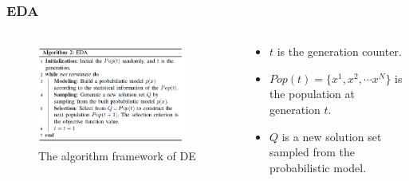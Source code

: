 \documentclass[xcolor=dvipsnames]{beamer}
\begin{document}
    \begin{frame}
    \frametitle{EDA}
    \begin{columns}
        \begin{column}{0.5\textwidth}
        \begin{figure}[H]
            \graphicspath{{figs/}}
            \includegraphics[width=0.9\textwidth]{eda.png}
            \caption{The algorithm framework of DE}
        \end{figure}
    \end{column}
    \begin{column}{0.5\textwidth}
    \begin{itemize}\small
    \setlength\itemsep{0em}
    \item $t$ is the generation counter.
    \item $Pop(t)=\{x^1,x^2, \cdots x^N\}$ is the population at generation $t$.
    \item $Q$ is a new solution set sampled from the probabilistic model.
    \end{itemize}
    \end{column}
    \end{columns}   
    \end{frame}
\end{document}
